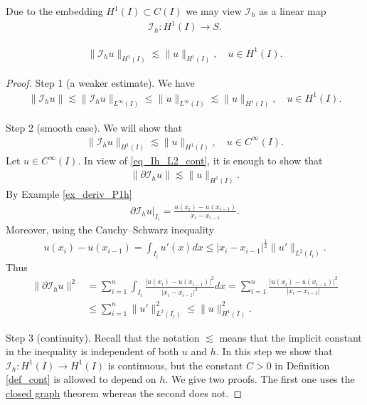 \documentclass[12pt,oneside]{amsart}
\def\p{\partial}
\def\I{\mathcal I}
\begin{document}
Due to the embedding $H^1(I) \subset C(I)$ we may view $\I_h$ as a linear map 
    \begin{align*}
\I_h : H^1(I) \to S.
    \end{align*}

\begin{theorem}
    \begin{align*}
\|\I_h u\|_{H^1(I)} \lesssim \|u\|_{H^1(I)},
\quad u \in H^1(I).
    \end{align*}
\end{theorem}
\begin{proof} 
Step 1 (a weaker estimate).
We have 
    \begin{align}\label{eq_Ih_L2_cont}
\|\I_h u\| \lesssim \|\I_h u\|_{L^\infty(I)}
\le \|u\|_{L^\infty(I)} \lesssim \|u\|_{H^1(I)}, \quad u \in H^1(I).
    \end{align}

Step 2 (smooth case).
We will show that 
    \begin{align}\label{eq_Ih_cont_pre}
\|\I_h u\|_{H^1(I)} \lesssim \|u\|_{H^1(I)},
\quad u \in C^\infty(I).
    \end{align}
Let $u \in C^\infty(I)$. In view of \eqref{eq_Ih_L2_cont}, it is enough to show that
    \begin{align*}
\|\p \I_h u\| \lesssim \|u\|_{H^1(I)}.
    \end{align*}
By Example \ref{ex_deriv_P1h}
    \begin{align*}
\p \I_h u|_{I_i} = \frac{u(x_i) - u(x_{i-1})}{x_i - x_{i-1}}.
    \end{align*}
Moreover, using the Cauchy--Schwarz inequality
    \begin{align*}
u(x_i) - u(x_{i-1}) = \int_{I_i} u'(x) dx \le |x_i - x_{i-1}|^{\frac12} \|u'\|_{L^2(I_i)}.
    \end{align*}
Thus
    \begin{align*}
\|\p \I_h u\|^2 
&= 
\sum_{i=1}^n \int_{I_i} 
\frac{|u(x_i) - u(x_{i-1})|^2}{|x_i - x_{i-1}|^2} dx
= 
\sum_{i=1}^n \frac{|u(x_i) - u(x_{i-1})|^2}{|x_i - x_{i-1}|}
\\&\le 
\sum_{i=1}^n \|u'\|_{L^2(I_i)}^2 \le \|u\|_{H^1(I)}^2.
    \end{align*}

Step 3 (continuity).
Recall that the notation $\lesssim$ means that the implicit constant in the inequality is independent of both $u$ and $h$.
In this step we show that $\I_h : H^1(I) \to H^1(I)$ is continuous, but the constant $C > 0$ in Definition \ref{def_cont} is allowed to depend on $h$. We give two proofs. The first one uses 
the \href{https://en.wikipedia.org/wiki/Closed_graph_theorem}{closed graph} theorem whereas the second does not.


\end{proof}
\end{document}
